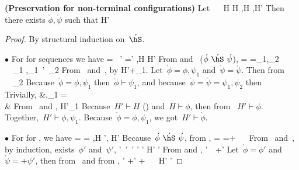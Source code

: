 \begin{lemma}  \textbf{(Preservation for non-terminal configurations)}
\label{Lemma:Preservation2}
Let
    \acute{\phi}~\acute{\hS}~\acute{\psi}
    \gap
    \vdash \acute{\hS}
    \gap
    \vdash H
    \gap
    H \vdash \acute{\phi}
    \gap
    \acute{\hS},H \reducesto \grave{\hS},H'
\eeq
Then there exists $\grave{\phi},\grave{\psi}$ such
    that
H' \vdash \grave{\phi}
\gap
\grave{\phi}~\grave{\hS}~\grave{\psi}
\gap
\grave{\phi} \vdash \acute{\phi}
\gap
\grave{\psi} \vdash \acute{\psi}
\eeq
\end{lemma}
\begin{proof}
By structural induction on~$\acute{\hS}$.

$\bullet$
For  for sequences we have
 \acute{\hS} = \hS~\hS' \gap
 \grave{\hS}=\hS' \gap
 \hS,H \reduce H'
\eeq
From  and~ ($\acute{\phi}~\acute{\hS}~\acute{\psi}$),
  \acute{\phi}=\phi
    \gap
  \acute{\psi}=\psi_1,\psi_2
    \gap
  \phi~\hS~\psi_1
    \gap
  \phi,\psi_1~\hS'~\psi_2
\eeq
From~ and~, by 
    H'\vdash +\psi_1.
\eeq
Let~$\grave{\phi}=\phi,\psi_1$ and~$\grave{\psi}=\acute{\psi}$.
Then from~
    \grave{\phi}~\grave{\hS}~\psi_2
\eeq
Because~$\grave{\phi}=\phi,\psi_1$ then~$\grave{\phi} \vdash \psi_1$, and because~$\grave{\psi}=\acute{\psi}=\psi_1,\psi_2$ then
    \grave{\phi}~\grave{\hS}~\grave{\psi}
\eeq
Trivially,
    &\phi,\psi_1 \vdash \phi
    \gap
    \grave{\psi} = \acute{\psi} \\
    &\grave{\phi} \vdash \acute{\phi}
    \gap
    \grave{\psi} \vdash \acute{\psi}
\eeq
From~ and ,
    H'\vdash \psi_1
\eeq
Because~$H' \vdash H$ () and~$H \vdash\phi$, then from ~$H' \vdash\phi$.
Together,~$H' \vdash \phi,\psi_1$.
Because~$\grave{\phi}=\phi,\psi_1$, we got~$H' \vdash \grave{\phi}$.


$\bullet$
For  for \hfinish, we have
 \acute{\hS} = \finish{\hS} \gap
 \grave{\hS}= \gap
 \hS,H \reduce \hS', H'
\eeq
Because~$\acute{\phi}~\acute{\hS}~\acute{\psi}$, from ,
  \acute{\phi}=\phi
    \gap
  \acute{\psi}=+\psi
    \gap
  \phi~\hS~\psi
\eeq
From~ and~, by induction, exists~$\phi'$ and~$\psi'$,
  \phi'~\hS'~\psi'
    \gap
  \phi' \vdash \phi
    \gap
  \psi' \vdash \psi
    \gap
  H' \vdash \phi'
\eeq
From  and ,
  \phi'~~+\psi'
\eeq
Let~$\grave{\phi}=\phi'$ and~$\grave{\psi}=+\psi'$, then from~ and
    from ,
    \phi' \vdash \phi
    \gap
    +\psi' \vdash +\psi
    \gap
    \grave{\phi}~\grave{\hS}~\grave{\psi}
    \gap
    H' \vdash \phi'
\eeq


\end{proof}
